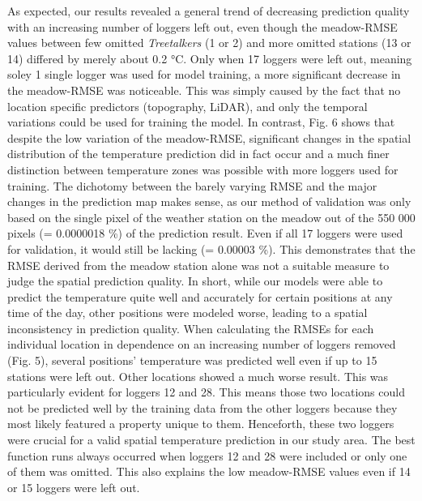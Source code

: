 \documentclass[5p]{elsarticle} %
\begin{document}
As expected, our results revealed a general trend of decreasing prediction quality with an increasing number of loggers left out, even though the meadow-RMSE values between few omitted \emph{Treetalkers} (1 or 2) and more omitted stations (13 or 14) differed by merely about 0.2 °C. Only when 17 loggers were left out, meaning soley 1 single logger was used for model training, a more significant decrease in the meadow-RMSE was noticeable. This was simply caused by the fact that no location specific predictors (topography, LiDAR), and only the temporal variations could be used for training the model. In contrast, Fig. 6 shows that despite the low variation of the meadow-RMSE, significant changes in the spatial distribution of the temperature prediction did in fact occur and a much finer distinction between temperature zones was possible with more loggers used for training. The dichotomy between the barely varying RMSE and the major changes in the prediction map makes sense, as our method of validation was only based on the single pixel of the weather station on the meadow out of the 550 000 pixels (= 0.0000018 \%) of the prediction result. Even if all 17 loggers were used for validation, it would still be lacking (= 0.00003 \%). This demonstrates that the RMSE derived from the meadow station alone was not a suitable measure to judge the spatial prediction quality. In short, while our models were able to predict the temperature quite well and accurately for certain positions at any time of the day, other positions were modeled worse, leading to a spatial inconsistency in prediction quality. 
When calculating the RMSEs for each individual location in dependence on an increasing number of loggers removed (Fig. 5), several positions’ temperature was predicted well even if up to 15 stations were left out. Other locations showed a much worse result. This was particularly evident for loggers 12 and 28. This means those two locations could not be predicted well by the training data from the other loggers because they most likely featured a property unique to them. Henceforth, these two loggers were crucial for a valid spatial temperature prediction in our study area. The best function runs always occurred when loggers 12 and 28 were included or only one of them was omitted. This also explains the low meadow-RMSE values even if 14 or 15 loggers were left out.\\  
\end{document}
